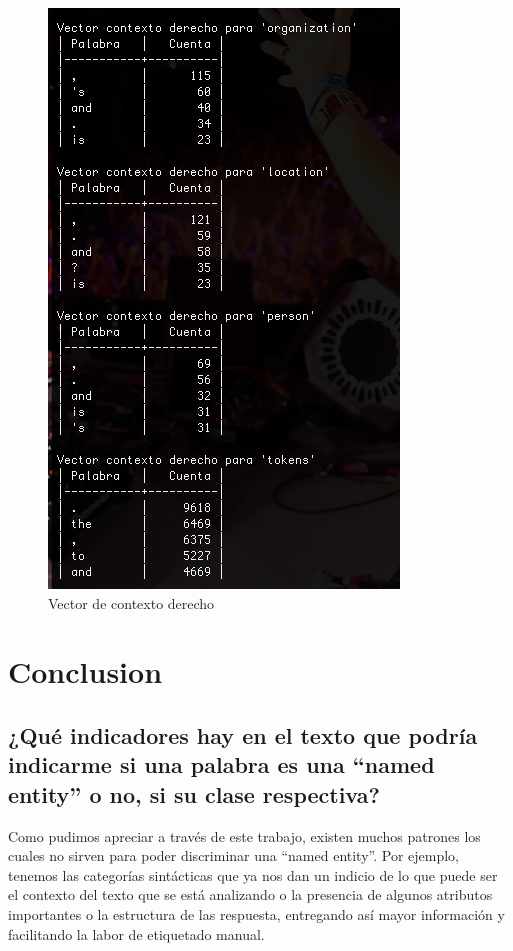 \documentclass{article}
\begin{document}
\begin{figure}[h!]
\centering
\includegraphics[scale=0.5]{figuras/derecho.png}
\caption{Vector de contexto derecho}
\label{fig:derecho}
\end{figure}

\newpage
\section{Conclusion}
\subsection{¿Qué indicadores hay en el texto que podría indicarme si una palabra es una ``named entity'' o no, si su clase respectiva?}
Como pudimos apreciar a través de este trabajo, existen muchos patrones los cuales no sirven para poder discriminar una ``named entity''. Por ejemplo, tenemos las categorías sintácticas que ya nos dan un indicio de lo que puede ser el contexto del texto que se está analizando o la presencia de algunos atributos importantes o la estructura de las respuesta, entregando así mayor información y facilitando la labor de etiquetado manual.
\end{document}
